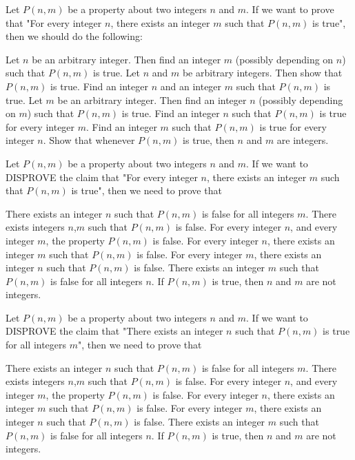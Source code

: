 \documentclass[twoside,a4paper,leqno]{article}
\begin{document}
\begin{esercizi*}{}
\begin{exerm}
  Let $P(n,m)$ be a property about two integers $n$ and $m$.  If we want to prove that "For every integer $n$, there exists an integer $m$ such that $P(n,m)$ is true", then we should do the following:
\begin{rispm}
\risp[=]  Let $n$ be an arbitrary integer.  Then find an integer $m$ (possibly depending on $n$) such that $P(n,m)$ is true.
\risp  Let $n$ and $m$ be arbitrary integers.  Then show that $P(n,m)$ is true.
\risp  Find an integer $n$ and an integer $m$ such that $P(n,m)$ is true.
\risp  Let $m$ be an arbitrary integer.  Then find an integer $n$ (possibly depending on $m$) such that $P(n,m)$ is true.
\risp  Find an integer $n$ such that $P(n,m)$ is true for every integer $m$.
\risp  Find an integer $m$ such that $P(n,m)$ is true for every integer $n$.
\risp  Show that whenever $P(n,m)$ is true, then $n$ and $m$ are integers.
\end{rispm}
\end{exerm}

\begin{exerm}
  Let $P(n,m)$ be a property about two integers $n$ and $m$.  If we want to DISPROVE the claim that "For every integer $n$, there exists an integer $m$ such that $P(n,m)$ is true", then we need to prove that
\begin{rispm}
\risp[=]  There exists an integer $n$ such that $P(n,m)$ is false for all integers $m$.
\risp  There exists integers $n$,$m$ such that $P(n,m)$ is false.
\risp  For every integer $n$, and every integer $m$, the property $P(n,m)$ is false.
\risp  For every integer $n$, there exists an integer $m$ such that $P(n,m)$ is false.
\risp  For every integer $m$, there exists an integer $n$ such that $P(n,m)$ is false.
\risp  There exists an integer $m$ such that $P(n,m)$ is false for all integers $n$.
\risp  If $P(n,m)$ is true, then $n$ and $m$ are not integers.
\end{rispm}
\end{exerm}

\begin{exerm}
  Let $P(n,m)$ be a property about two integers $n$ and $m$.  If we want to DISPROVE the claim that "There exists an integer $n$ such that $P(n,m)$ is true for all integers $m$", then we need to prove that
\begin{rispm}
\risp  There exists an integer $n$ such that $P(n,m)$ is false for all integers $m$.
\risp  There exists integers $n$,$m$ such that $P(n,m)$ is false.
\risp  For every integer $n$, and every integer $m$, the property $P(n,m)$ is false.
\risp[=]  For every integer $n$, there exists an integer $m$ such that $P(n,m)$ is false.
\risp  For every integer $m$, there exists an integer $n$ such that $P(n,m)$ is false.
\risp  There exists an integer $m$ such that $P(n,m)$ is false for all integers $n$.
\risp  If $P(n,m)$ is true, then $n$ and $m$ are not integers.
\end{rispm}
\end{exerm}


\end{esercizi*}
\end{document}
